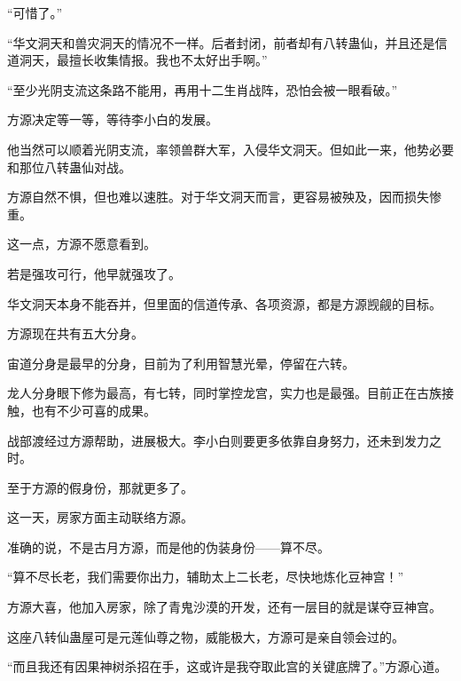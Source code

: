 \begin{this_body}
“可惜了。”

“华文洞天和兽灾洞天的情况不一样。后者封闭，前者却有八转蛊仙，并且还是信道洞天，最擅长收集情报。我也不太好出手啊。”

“至少光阴支流这条路不能用，再用十二生肖战阵，恐怕会被一眼看破。”

方源决定等一等，等待李小白的发展。

他当然可以顺着光阴支流，率领兽群大军，入侵华文洞天。但如此一来，他势必要和那位八转蛊仙对战。

方源自然不惧，但也难以速胜。对于华文洞天而言，更容易被殃及，因而损失惨重。

这一点，方源不愿意看到。

若是强攻可行，他早就强攻了。

华文洞天本身不能吞并，但里面的信道传承、各项资源，都是方源觊觎的目标。

方源现在共有五大分身。

宙道分身是最早的分身，目前为了利用智慧光晕，停留在六转。

龙人分身眼下修为最高，有七转，同时掌控龙宫，实力也是最强。目前正在古族接触，也有不少可喜的成果。

战部渡经过方源帮助，进展极大。李小白则要更多依靠自身努力，还未到发力之时。

至于方源的假身份，那就更多了。

这一天，房家方面主动联络方源。

准确的说，不是古月方源，而是他的伪装身份——算不尽。

“算不尽长老，我们需要你出力，辅助太上二长老，尽快地炼化豆神宫！”

方源大喜，他加入房家，除了青鬼沙漠的开发，还有一层目的就是谋夺豆神宫。

这座八转仙蛊屋可是元莲仙尊之物，威能极大，方源可是亲自领会过的。

“而且我还有因果神树杀招在手，这或许是我夺取此宫的关键底牌了。”方源心道。

\end{this_body}

